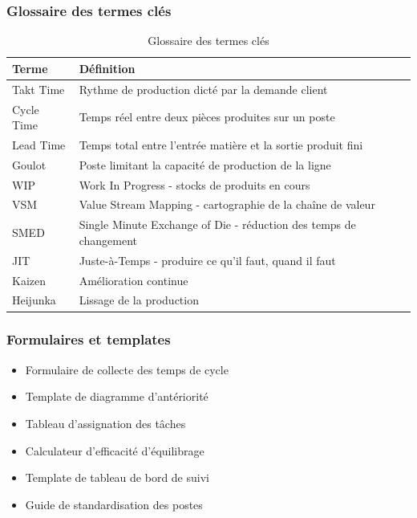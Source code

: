 \documentclass[12pt,a4paper]{article}
\newenvironment{methodbox}[1]
  {\begin{tcolorbox}[colback=blue!5!white, colframe=methodcolor, title=#1]\small}
  {\end{tcolorbox}}
\begin{document}
\begin{center}
\subsubsection{Glossaire des termes clés}

\begin{table}[H]
\centering
\begin{tabular}{|p{3cm}|p{9cm}|}
\hline
\textbf{Terme} & \textbf{Définition} \\
\hline
Takt Time & Rythme de production dicté par la demande client \\
\hline
Cycle Time & Temps réel entre deux pièces produites sur un poste \\
\hline
Lead Time & Temps total entre l'entrée matière et la sortie produit fini \\
\hline
Goulot & Poste limitant la capacité de production de la ligne \\
\hline
WIP & Work In Progress - stocks de produits en cours \\
\hline
VSM & Value Stream Mapping - cartographie de la chaîne de valeur \\
\hline
SMED & Single Minute Exchange of Die - réduction des temps de changement \\
\hline
JIT & Juste-à-Temps - produire ce qu'il faut, quand il faut \\
\hline
Kaizen & Amélioration continue \\
\hline
Heijunka & Lissage de la production \\
\hline
\end{tabular}
\caption{Glossaire des termes clés}
\end{table}

\subsubsection{Formulaires et templates}

\begin{methodbox}{Documents utiles à télécharger}
\begin{itemize}
    \item Formulaire de collecte des temps de cycle
    \item Template de diagramme d'antériorité
    \item Tableau d'assignation des tâches
    \item Calculateur d'efficacité d'équilibrage
    \item Template de tableau de bord de suivi
    \item Guide de standardisation des postes
\end{itemize}
\end{methodbox}


\end{center}
\end{document}
